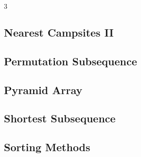 \documentclass[8pt]{extarticle}
\begin{document}
\begin{multicols*}{3}
\subsection{Nearest Campsites II}
\begin{caixaenunciado}

\end{caixaenunciado}
\vspace{0.3cm}


\subsection{Permutation Subsequence}
\begin{caixaenunciado}

\end{caixaenunciado}
\vspace{0.3cm}


\subsection{Pyramid Array}
\begin{caixaenunciado}

\end{caixaenunciado}
\vspace{0.3cm}


\subsection{Shortest Subsequence}
\begin{caixaenunciado}

\end{caixaenunciado}
\vspace{0.3cm}


\subsection{Sorting Methods}
\begin{caixaenunciado}

\end{caixaenunciado}
\vspace{0.3cm}



\end{multicols*}
\end{document}
